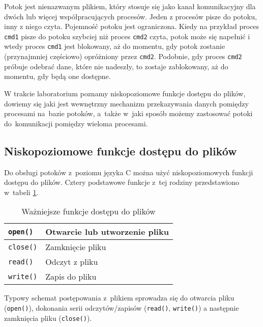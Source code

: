Potok jest nienazwanym plikiem, który stosuje się jako kanał komunikacyjny dla
dwóch lub więcej współpracujących procesów. Jeden z procesów pisze do potoku,
inny z niego czyta. Pojemność potoku jest ograniczona. Kiedy na przykład proces
\texttt{cmd1} pisze do potoku szybciej niż proces \texttt{cmd2} czyta, potok
może się napełnić i wtedy proces \texttt{cmd1} jest blokowany, aż do momentu,
gdy potok zostanie (przynajmniej częściowo) opróżniony przez \texttt{cmd2}.
Podobnie, gdy proces \texttt{cmd2} próbuje odebrać dane, które nie nadeszły, to
zostaje zablokowany, aż do momentu, gdy będą one dostępne.

W trakcie laboratorium poznamy niskopoziomowe funkcje dostępu do plików,
dowiemy się jaki jest wewnętrzny mechanizm przekazywania danych pomiędzy
procesami na~bazie potoków, a~także w~jaki sposób możemy zastosować potoki
do~komunikacji pomiędzy wieloma procesami.

\subsection{Niskopoziomowe funkcje dostępu do plików}
\label{sec:F6P4D}

Do obsługi potoków z~poziomu języka C można użyć niskopoziomowych funkcji
dostępu do plików. Cztery podstawowe funkcje z~tej rodziny przedstawiono
w~tabeli \ref{tab:67EKH}.
\begin{table}[!h]
  \centering
  \caption{Ważniejsze funkcje dostępu do plików}
  \label{tab:67EKH}
  \begin{tabular}{|l|l|}
    \hline
    \texttt{open()}   & Otwarcie lub utworzenie pliku \\ \hline
    \texttt{close()}  & Zamknięcie pliku \\ \hline
    \texttt{read()}   & Odczyt z pliku \\ \hline
    \texttt{write()}  & Zapis do pliku \\ \hline
  \end{tabular}
\end{table}
Typowy schemat postępowania z~plikiem sprowadza się do otwarcia pliku
(\texttt{open()}), dokonania serii odczytów/zapisów (\texttt{read()},
\texttt{write()}) a następnie zamknięcia pliku (\texttt{close()}).

